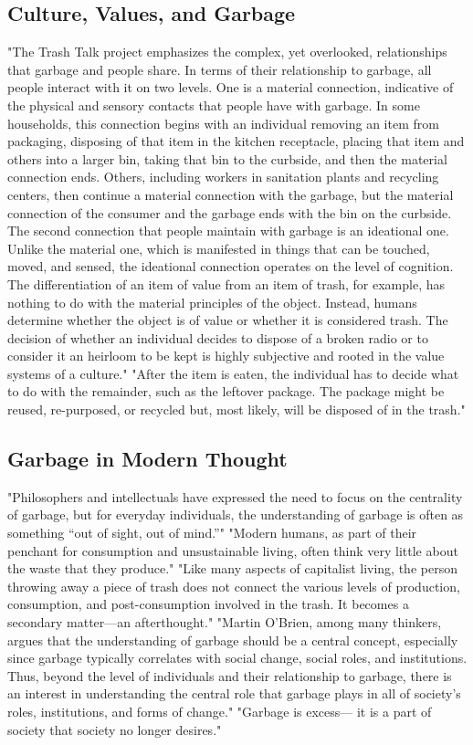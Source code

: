 \subsection{Culture, Values, and Garbage}
"The Trash Talk project emphasizes the complex, yet overlooked, relationships that garbage and people share. In terms of their relationship to garbage, all people interact with it on two levels. One is a material connection, indicative of the physical and sensory contacts that people have with garbage. In some households, this connection begins with an individual removing an item from packaging, disposing of that item in the kitchen receptacle, placing that item and others into a larger bin, taking that bin to the curbside, and then the material connection ends. Others, including workers in sanitation plants and recycling centers, then continue a material connection with the garbage, but the material connection of the consumer and the garbage ends with the bin on the curbside. The second connection that people maintain with garbage is an ideational one. Unlike the material one, which is manifested in things that can be touched, moved, and sensed, the ideational connection operates on the level of cognition. The differentiation of an item of value from an item of trash, for example, has nothing to do with the material principles of the object. Instead, humans determine whether the object is of value or whether it is considered trash. The decision of whether an individual decides to dispose of a broken radio or to consider it an heirloom to be kept is highly subjective and rooted in the value systems of a culture." "After the item is eaten, the individual has to decide what to do with the remainder, such as the leftover package. The package might be reused, re-purposed, or recycled but, most likely, will be disposed of in the trash." \cite{lukas2012culture}

\subsection{Garbage in Modern Thought}
"Philosophers and intellectuals have expressed the need to focus on the centrality of garbage, but for everyday individuals, the understanding of garbage is often as something “out of sight, out of mind.”" "Modern humans, as part of their penchant for consumption and unsustainable living, often think very little about the waste that they produce." "Like many aspects of capitalist living, the person throwing away a piece of trash does not connect the various levels of production, consumption, and post-consumption involved in the trash. It becomes a secondary matter---an afterthought." "Martin O’Brien, among many thinkers, argues that the understanding of garbage should be a central concept, especially since garbage typically correlates with social change, social roles, and institutions. Thus, beyond the level of individuals and their relationship to garbage, there is an interest in understanding the central role that garbage plays in all of society’s roles, institutions, and forms of change." "Garbage is excess--- it is a part of society that society no longer desires." \cite{lukas2012garbage}

